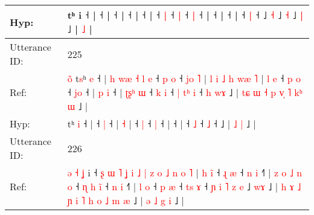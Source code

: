 \documentclass[10pt]{article}
\DeclareRobustCommand{\hl}[1]{{\textcolor{red}{#1}}}
\begin{document}
\begin{longtable}{ll}
 \\
Hyp: & tʰ i\hl{}\hl{}\hl{}\hl{}\hl{}\hl{}\hl{}\hl{}\hl{} ˧\hl{}\hl{}\hl{}\hl{}\hl{}\hl{}\hl{}\hl{}\hl{}\hl{}\hl{}\hl{}\hl{}\hl{}\hl{}\hl{}\hl{}\hl{} |\hl{}\hl{}\hl{}\hl{}\hl{} ˧ |\hl{}\hl{}\hl{}\hl{}\hl{}\hl{}\hl{}\hl{}\hl{} ˧\hl{}\hl{}\hl{}\hl{}\hl{}\hl{}\hl{} |\hl{}\hl{}\hl{}\hl{}\hl{}\hl{}\hl{} ˧\hl{} |\hl{}\hl{}\hl{}\hl{}\hl{}\hl{}\hl{}\hl{}\hl{}\hl{} ˧ |\hl{}\hl{}\hl{}\hl{}\hl{}\hl{}\hl{}\hl{}\hl{}\hl{}\hl{}\hl{}\hl{}\hl{}\hl{}\hl{}\hl{}\hl{}\hl{}\hl{}\hl{}\hl{}\hl{}\hl{}\hl{} ˧\hl{}\hl{} \hl{|} ˧\hl{}\hl{} \hl{|} ˧\hl{}\hl{}\hl{} \hl{|} ˧\hl{}\hl{}\hl{}\hl{}\hl{} |\hl{}\hl{}\hl{}\hl{}\hl{}\hl{}\hl{}\hl{}\hl{}\hl{} ˧ |\hl{}\hl{}\hl{}\hl{}\hl{} ˧\hl{}\hl{}\hl{}\hl{}\hl{}\hl{} |\hl{}\hl{}\hl{}\hl{}\hl{}\hl{} ˧\hl{}\hl{}\hl{} \hl{}\hl{|} ˧\hl{}\hl{}\hl{}\hl{}\hl{}\hl{}\hl{}\hl{}\hl{}\hl{}\hl{}\hl{}\hl{}\hl{}\hl{}\hl{}\hl{}\hl{}\hl{} ˩\hl{}\hl{} \hl{˧} ˩\hl{}\hl{}\hl{} \hl{˧} ˩\hl{}\hl{} \hl{|} ˩ |\hl{}\hl{}\hl{}\hl{} \hl{˩} |
 \\
\midrule
Utterance ID: & 225 \\
Ref: & \hl{o}\hl{̃}\hl{ }t\hl{s}ʰ \hl{e} ˧ |\hl{ }\hl{h}\hl{ }\hl{w}\hl{æ}\hl{ }\hl{˧}\hl{ }\hl{l}\hl{ }\hl{e} ˧\hl{ }\hl{p} \hl{o} ˧\hl{ }\hl{j}\hl{o}\hl{ }\hl{˥} |\hl{ }\hl{l}\hl{ }\hl{i}\hl{ }\hl{˩}\hl{ }\hl{h}\hl{ }\hl{w}\hl{æ} \hl{˥} |\hl{ }\hl{l}\hl{ }\hl{e} ˧\hl{ }\hl{p} \hl{o} ˧ \hl{j}\hl{o} ˧ |\hl{ }\hl{p}\hl{ }\hl{i} ˧ |\hl{ }\hl{ʈ}\hl{ʂ}\hl{ʰ}\hl{ }\hl{ɯ} ˧\hl{ }\hl{k} \hl{i} ˧\hl{ }\hl{|}\hl{ }\hl{t}\hl{ʰ} \hl{i} ˧\hl{ }\hl{h}\hl{ }\hl{w}\hl{ɤ} ˩ |\hl{ }\hl{t}\hl{ɕ}\hl{ }\hl{ɯ}\hl{ }\hl{˧}\hl{ }\hl{p}\hl{ }\hl{v}\hl{̩}\hl{ }\hl{˥} \hl{k}\hl{ʰ} \hl{ɯ} ˩ |
 \\
Hyp: & \hl{}\hl{}\hl{}t\hl{}ʰ \hl{i} ˧ |\hl{}\hl{}\hl{}\hl{}\hl{}\hl{}\hl{}\hl{}\hl{}\hl{}\hl{} ˧\hl{}\hl{} \hl{|} ˧\hl{}\hl{}\hl{}\hl{}\hl{} |\hl{}\hl{}\hl{}\hl{}\hl{}\hl{}\hl{}\hl{}\hl{}\hl{}\hl{} \hl{˧} |\hl{}\hl{}\hl{}\hl{} ˧\hl{}\hl{} \hl{|} ˧ \hl{}\hl{|} ˧ |\hl{}\hl{}\hl{}\hl{} ˧ |\hl{}\hl{}\hl{}\hl{}\hl{}\hl{} ˧\hl{}\hl{} \hl{˩} ˧\hl{}\hl{}\hl{}\hl{}\hl{} \hl{˩} ˧\hl{}\hl{}\hl{}\hl{}\hl{} ˩ |\hl{}\hl{}\hl{}\hl{}\hl{}\hl{}\hl{}\hl{}\hl{}\hl{}\hl{}\hl{}\hl{}\hl{} \hl{}\hl{˩} \hl{|} ˩ |
 \\
\midrule
Utterance ID: & 226 \\
Ref: & \hl{ə}\hl{ }\hl{˧}\hl{ }\hl{ʝ} i ˧\hl{ }\hl{ʂ}\hl{ }\hl{ɯ}\hl{ }\hl{˥}\hl{ }\hl{ʝ}\hl{ }\hl{i}\hl{ }\hl{˩}\hl{ }\hl{|}\hl{ }\hl{z}\hl{ }\hl{o}\hl{ }\hl{˩}\hl{ }\hl{n}\hl{ }\hl{o}\hl{ }\hl{˥} |\hl{ }\hl{h}\hl{ }\hl{i}\hl{̃} ˧\hl{ }\hl{ɻ} \hl{æ} ˧\hl{ }\hl{n} \hl{i} ˧\hl{˥} |\hl{ }\hl{z}\hl{ }\hl{o}\hl{ }\hl{˩}\hl{ }\hl{n}\hl{ }\hl{o} ˧\hl{ }\hl{ɳ}\hl{ }\hl{h} \hl{i}\hl{̃} ˧\hl{ }\hl{n} \hl{i} ˧\hl{˥} |\hl{ }\hl{l}\hl{ }\hl{o} ˧\hl{ }\hl{p} \hl{æ} ˧\hl{ }\hl{t}\hl{s} \hl{ɤ} ˧\hl{ }\hl{ɲ}\hl{ }\hl{i}\hl{ }\hl{˥}\hl{ }\hl{z}\hl{ }\hl{e} ˩ \hl{w}\hl{ɤ} ˩ |\hl{ }\hl{h}\hl{ }\hl{ɤ}\hl{ }\hl{˩}\hl{ }\hl{ɲ}\hl{ }\hl{i}\hl{ }\hl{˥}\hl{ }\hl{h}\hl{ }\hl{o}\hl{ }\hl{˩}\hl{ }\hl{m}\hl{ }\hl{æ} ˩ |\hl{ }\hl{ə}\hl{ }\hl{˩}\hl{ }\hl{g}\hl{ }\hl{i} ˩ |

\end{longtable}
\end{document}
